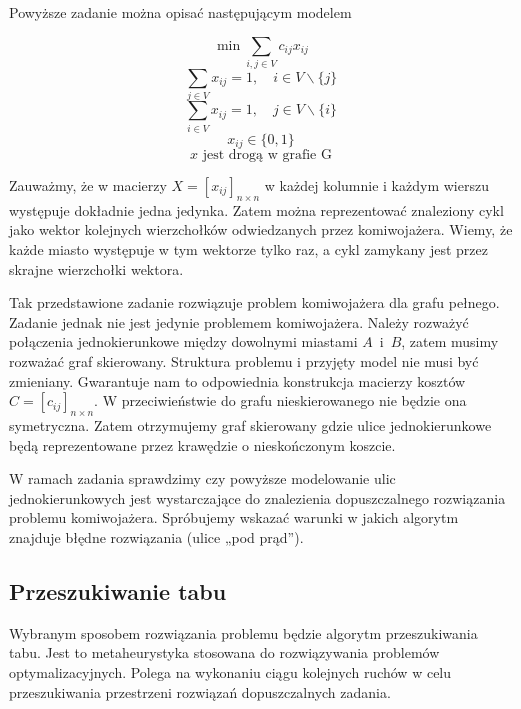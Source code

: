 \documentclass[11pt,a4paper,twoside]{article}
\begin{document}
Powyższe zadanie można opisać następującym modelem

\begin{equation}
\min \sum_{i,j \in V} c_{ij} x_{ij} 
\label{f_celu}
\end{equation}
\begin{equation}
\sum_{j \in V} x_{ij}=1, \quad i \in V \backslash \{j\} 
\end{equation}
\begin{equation}
\sum_{i \in V} x_{ij}=1, \quad j \in V \backslash \{i\} 
\end{equation}
\begin{equation}
x_{ij} \in \{0,1\}
\end{equation}
\begin{equation}
x \text{ jest drogą w grafie G}
\end{equation}


Zauważmy, że w macierzy $X = [x_{ij}]_{n\times n}$ w każdej kolumnie i każdym wierszu występuje dokładnie jedna jedynka. Zatem można reprezentować znaleziony cykl jako wektor kolejnych wierzchołków odwiedzanych przez komiwojażera. Wiemy, że każde miasto występuje w tym wektorze tylko raz, a cykl zamykany jest przez skrajne wierzchołki wektora.

Tak przedstawione zadanie rozwiązuje problem komiwojażera dla grafu pełnego. Zadanie jednak nie jest jedynie problemem komiwojażera. Należy rozważyć połączenia jednokierunkowe między dowolnymi miastami \mbox{$A$ i $B$}, zatem musimy rozważać graf skierowany. Struktura problemu i przyjęty model nie musi być zmieniany. Gwarantuje nam to odpowiednia konstrukcja macierzy kosztów $C = [c_{ij}]_{n\times n}$. W przeciwieństwie do grafu nieskierowanego nie będzie ona symetryczna. Zatem otrzymujemy graf skierowany gdzie ulice jednokierunkowe będą reprezentowane przez krawędzie o nieskończonym koszcie. 

W ramach zadania sprawdzimy czy powyższe modelowanie ulic jednokierunkowych jest wystarczające do znalezienia dopuszczalnego rozwiązania problemu komiwojażera. Spróbujemy wskazać warunki w jakich algorytm znajduje błędne rozwiązania (ulice „pod prąd”).

\subsection{Przeszukiwanie tabu}
Wybranym sposobem rozwiązania problemu będzie algorytm przeszukiwania tabu. Jest to metaheurystyka stosowana do rozwiązywania problemów optymalizacyjnych. Polega na  wykonaniu ciągu kolejnych ruchów w celu przeszukiwania przestrzeni rozwiązań dopuszczalnych zadania. 
\end{document}
